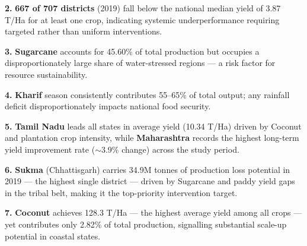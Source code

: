 \documentclass[10pt]{article}
\begin{document}
\vspace{3pt}

\begin{insightbox}
  \textbf{2.} \textbf{667 of 707 districts} (2019) fall below the national median yield
  of 3.87 T/Ha for at least one crop, indicating systemic underperformance requiring
  targeted rather than uniform interventions.
\end{insightbox}

\vspace{3pt}

\begin{insightbox}
  \textbf{3.} \textbf{Sugarcane} accounts for 45.60\% of total production but
  occupies a disproportionately large share of water-stressed regions — a risk
  factor for resource sustainability.
\end{insightbox}

\vspace{3pt}

\begin{insightbox}
  \textbf{4.} \textbf{Kharif} season consistently contributes 55–65\% of total
  output; any rainfall deficit disproportionately impacts national food security.
\end{insightbox}

\vspace{3pt}

\begin{insightbox}
  \textbf{5.} \textbf{Tamil Nadu} leads all states in average yield (10.34 T/Ha)
  driven by Coconut and plantation crop intensity, while \textbf{Maharashtra}
  records the highest long-term yield improvement rate ($\sim$3.9\% change)
  across the study period.
\end{insightbox}

\vspace{3pt}

\begin{insightbox}
  \textbf{6.} \textbf{Sukma} (Chhattisgarh) carries 34.9M tonnes of production
  loss potential in 2019 — the highest single district — driven by Sugarcane and
  paddy yield gaps in the tribal belt, making it the top-priority intervention target.
\end{insightbox}

\vspace{3pt}

\begin{insightbox}
  \textbf{7.} \textbf{Coconut} achieves 128.3 T/Ha — the highest average yield
  among all crops — yet contributes only 2.82\% of total production, signalling
  substantial scale-up potential in coastal states.
\end{insightbox}
\end{document}
